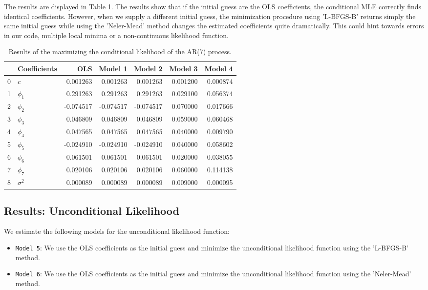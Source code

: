 \documentclass{article}
\begin{document}
The results are displayed in Table 1.
The results show that if the initial guess are the OLS coefficients, the conditional MLE correctly finds identical coefficients. However, when we supply a different initial guess, the minimization procedure using 'L-BFGS-B' returns simply the same initial guess while using the 'Neler-Mead' method changes the estimated coefficients quite dramatically.
This could hint towards errors in our code, multiple local minima or a non-continuous likelihood function.

\begin{table}[h]
\centering
\begin{tabular}{llrrrrr}
\toprule
 & Coefficients & OLS & Model 1 & Model 2 & Model 3 & Model 4 \\
\midrule
0 & $c$ & 0.001263 & 0.001263 & 0.001263 & 0.001200 & 0.000874 \\
1 & $\phi_1$ & 0.291263 & 0.291263 & 0.291263 & 0.029100 & 0.056374 \\
2 & $\phi_2$ & -0.074517 & -0.074517 & -0.074517 & 0.070000 & 0.017666 \\
3 & $\phi_3$ & 0.046809 & 0.046809 & 0.046809 & 0.059000 & 0.060468 \\
4 & $\phi_4$ & 0.047565 & 0.047565 & 0.047565 & 0.040000 & 0.009790 \\
5 & $\phi_5$ & -0.024910 & -0.024910 & -0.024910 & 0.040000 & 0.058602 \\
6 & $\phi_6$ & 0.061501 & 0.061501 & 0.061501 & 0.020000 & 0.038055 \\
7 & $\phi_7$ & 0.020106 & 0.020106 & 0.020106 & 0.060000 & 0.114138 \\
8 & $\sigma^2$ & 0.000089 & 0.000089 & 0.000089 & 0.009000 & 0.000095 \\
\bottomrule
\end{tabular}
\caption{Results of the maximizing the conditional likelihood of the AR(7) process.}
\end{table}
\subsection{Results: Unconditional Likelihood}
We estimate the following models for the unconditional likelihood function:
\begin{itemize}
\item \texttt{Model 5}: We use the OLS coefficients as the initial guess and minimize the unconditional likelihood function using the 'L-BFGS-B' method.
\item \texttt{Model 6}: We use the OLS coefficients as the initial guess and minimize the unconditional likelihood function using the 'Neler-Mead' method.
\end{itemize}
\end{document}
